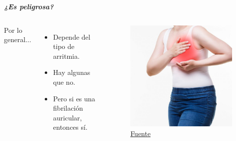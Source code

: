 \begin{frame}
    
\end{frame}



\begin{frame}

   \begin{center}
        \vspace{0cm}
       {\Large \color{TurkishRose}\textbf{\textit{¿Es peligrosa?}}} 
   \end{center}
   
   \pause
   
    \begin{columns}
        \centering
        {\hspace{-2cm}Por lo general...}\\
            \begin{itemize}
                \item Depende del tipo de arritmia.
                \item Hay algunas que no.
                \item Pero si es una fibrilación auricular, entonces sí.
            \end{itemize}
        \centering
            \begin{figure}
                \centering
                \includegraphics[width=1\linewidth]{Images/arritmia2.png}
                \caption{\href{https://www.65ymas.com/uploads/s1/92/58/1/fibrilacion-auricular_1_621x621.jpeg}{Fuente}}
            \end{figure}
    \end{columns}
\end{frame} 


